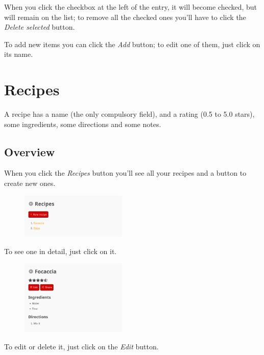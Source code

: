 \documentclass[12pt, a4paper]{article}
\begin{document}
    When you click the checkbox at the left of the entry, it will become
    checked, but will remain on the list; to remove all the checked ones you'll
    have to click the \emph{Delete selected} button.

    To add new items you can click the \emph{Add} button; to edit one of them,
    just click on its name.



    \section{Recipes}

    A recipe has a name (the only compulsory field), and a rating (0.5 to 5.0
    stars), some ingredients, some directions and some notes.

    \subsection{Overview}

    When you click the \emph{Recipes} button you'll see all your recipes and a
    button to create new ones.

    \begin{figure}[H]
        \centering
        \includegraphics[width=0.45\textwidth]{assets/en/recipes.png}
    \end{figure}

    To see one in detail, just click on it.

    \begin{figure}[H]
        \centering
        \includegraphics[width=0.45\textwidth]{assets/en/recipe.png}
    \end{figure}

    To edit or delete it, just click on the \emph{Edit} button.
\end{document}
